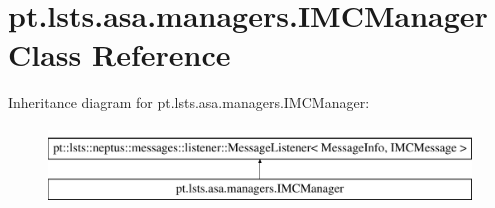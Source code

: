 \hypertarget{classpt_1_1lsts_1_1asa_1_1managers_1_1IMCManager}{}\section{pt.\+lsts.\+asa.\+managers.\+I\+M\+C\+Manager Class Reference}
\label{classpt_1_1lsts_1_1asa_1_1managers_1_1IMCManager}
Inheritance diagram for pt.\+lsts.\+asa.\+managers.\+I\+M\+C\+Manager\+:\begin{figure}[H]
\begin{center}
\leavevmode
\includegraphics[height=2.000000cm]{classpt_1_1lsts_1_1asa_1_1managers_1_1IMCManager}
\end{center}
\end{figure}
